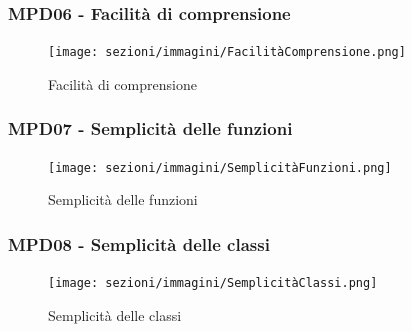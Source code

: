 \subsubsection{MPD06 - Facilità di comprensione}
\begin{figure}[!ht]
    \caption{Facilità di comprensione}
    \vspace{10px}
    \texttt{[image: sezioni/immagini/FacilitàComprensione.png]}
    \centering
\end{figure}
\subsubsection{MPD07 - Semplicità delle funzioni}
\begin{figure}[!ht]
    \caption{Semplicità delle funzioni}
    \vspace{10px}
    \texttt{[image: sezioni/immagini/SemplicitàFunzioni.png]}
    \centering
\end{figure}
\pagebreak
\subsubsection{MPD08 - Semplicità delle classi}
\begin{figure}[!ht]
    \caption{Semplicità delle classi}
    \vspace{10px}
    \texttt{[image: sezioni/immagini/SemplicitàClassi.png]}
    \centering
\end{figure}